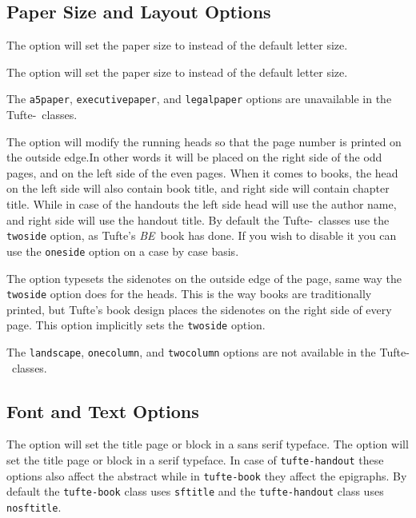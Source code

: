 \documentclass[a4paper]{tufte-handout}
\newcommand{\be}{\textit{BE}\xspace}
\newcommand{\TL}{Tufte-\hologo{LaTeX}\xspace}
\newcommand{\hlorange}[1]{\textcolor{tufte-orange}{#1}}
\newcommand{\doccls}[1]{\texttt{#1}}
\newcommand{\docclsopt}[1]{\hlorange{\texttt{#1}}}
\begin{document}
\subsection{Paper Size and Layout Options}\label{ssec:paper-size-layout-options}
The  option will set the paper size to  instead of the default  letter size.

The  option will set the paper size to  instead of the default  letter size.

The \docclsopt{a5paper}, \docclsopt{executivepaper}, and \docclsopt{legalpaper} options are unavailable in the \TL\ classes.

The  option will modify the running heads so that the page number is printed on the outside edge.In other words it will be placed on the right side of the odd pages, and on the left side of the even pages.
When it comes to books, the head on the left side will also contain book title, and right side will contain chapter title.
While in case of the handouts the left side head will use the author name, and right side will use the handout title.
By default the \TL\ classes use the \docclsopt{twoside} option, as Tufte's \be\ book has done.\cite{Tufte2006}
If you wish to disable it you can use the \docclsopt{oneside} option on a case by case basis.

The  option typesets the sidenotes on the outside edge of the page, same way the \docclsopt{twoside} option does for the heads.
This is the way books are traditionally printed, but Tufte's book design places the sidenotes on the right side of every page.
This option implicitly sets the \docclsopt{twoside} option.

The \docclsopt{landscape}, \docclsopt{onecolumn}, and \docclsopt{twocolumn} options are not available in the \TL\ classes.

\subsection{Font and Text Options}\label{ssec:font-options}
The  option will set the title page or block in a \textsf{sans serif} typeface.
The  option will set the title page or block in a serif typeface.
In case of \doccls{tufte-handout} these options also affect the abstract while in \doccls{tufte-book} they affect the epigraphs.
By default the \doccls{tufte-book} class uses \docclsopt{sftitle} and the \doccls{tufte-handout} class uses \docclsopt{nosftitle}.
\end{document}
